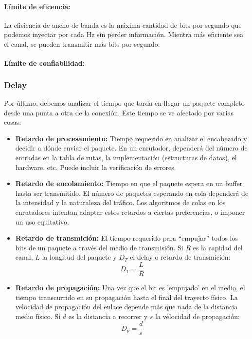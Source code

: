 \paragraph{Límite de eficencia:} La eficiencia de ancho de banda es la máxima cantidad de bits por segundo que podemos inyectar por cada Hz sin perder información. Mientra más eficiente sea el canal, se pueden transmitir más bits por segundo. 

\paragraph{Límite de confiabilidad:} 

\subsubsection{Delay}
Por último, debemos analizar el tiempo que tarda en llegar un paquete completo desde una punta a otra de la conexión. Este tiempo se ve afectado por varias cosas:
  \begin{itemize}
    \item \textbf{Retardo de procesamiento:} Tiempo requerido en analizar el encabezado y decidir a dónde enviar el paquete. En un enrutador, dependerá del número de entradas en la tabla de rutas, la implementación (estructuras de datos), el hardware, etc. Puede incluir la verificación de errores.
    \item \textbf{Retardo de encolamiento:} Tiempo en que el paquete espera en un buffer hasta ser transmitido. El número de paquetes esperando en cola dependerá de la intensidad y la naturaleza del tráfico. Los algoritmos de colas en los enrutadores intentan adaptar estos retardos a ciertas preferencias, o imponer un uso equitativo.
    \item \textbf{Retardo de transmición:} El tiempo requerido para “empujar” todos los bits de un paquete a través del medio de transmisión. Si \(R\) es la capidad del canal, \(L\) la longitud del paquete y \(D_T\) el delay o retardo de transmición:
    \[D_T = \frac{L}{R}\]
    \item \textbf{Retardo de propagación:} Una vez que el bit es 'empujado' en el medio, el tiempo transcurrido en su propagación hasta
    el final del trayecto físico. La velocidad de propagación del enlace depende más que nada de la distancia medio físico. Si \(d\) es la distancia a recorrer y \(s\) la velocidad de propagación:
    \[D_p = \frac{d}{s}\]
  \end{itemize}

